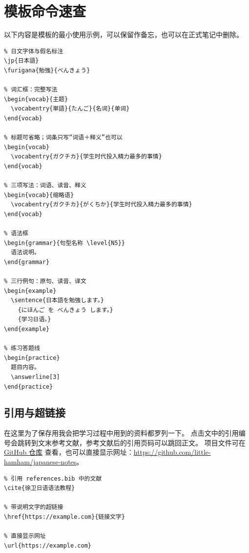 \clearpage
\section{模板命令速查}

以下内容是模板的最小使用示例，可以保留作备忘，也可以在正式笔记中删除。

\begin{lstlisting}
% 日文字体与假名标注
\jp{日本語}
\furigana{勉強}{べんきょう}

% 词汇框：完整写法
\begin{vocab}{主题}
  \vocabentry{単語}{たんご}{名词}{单词}
\end{vocab}

% 标题可省略；词条只写“词语＋释义”也可以
\begin{vocab}
  \vocabentry{ガクチカ}{学生时代投入精力最多的事情}
\end{vocab}

% 三项写法：词语、读音、释义
\begin{vocab}{缩略语}
  \vocabentry{ガクチカ}{がくちか}{学生时代投入精力最多的事情}
\end{vocab}

% 语法框
\begin{grammar}{句型名称 \level{N5}}
  语法说明。
\end{grammar}

% 三行例句：原句、读音、译文
\begin{example}
  \sentence{日本語を勉強します。}
    {にほんご を べんきょう します。}
    {学习日语。}
\end{example}

% 练习答题线
\begin{practice}
  题目内容。
  \answerline[3]
\end{practice}
\end{lstlisting}

\subsection*{引用与超链接}
在这里为了保存用我会把学习过程中用到的资料都罗列一下\cite{徐卫日语语法教程}。
点击文中的引用编号会跳转到文末参考文献，参考文献后的引用页码可以跳回正文。
项目文件可在
\href{https://github.com/little-hamham/japanese-notes}{GitHub 仓库}
查看，也可以直接显示网址：\url{https://github.com/little-hamham/japanese-notes}。

\begin{lstlisting}
% 引用 references.bib 中的文献
\cite{徐卫日语语法教程}

% 带说明文字的超链接
\href{https://example.com}{链接文字}

% 直接显示网址
\url{https://example.com}
\end{lstlisting}

